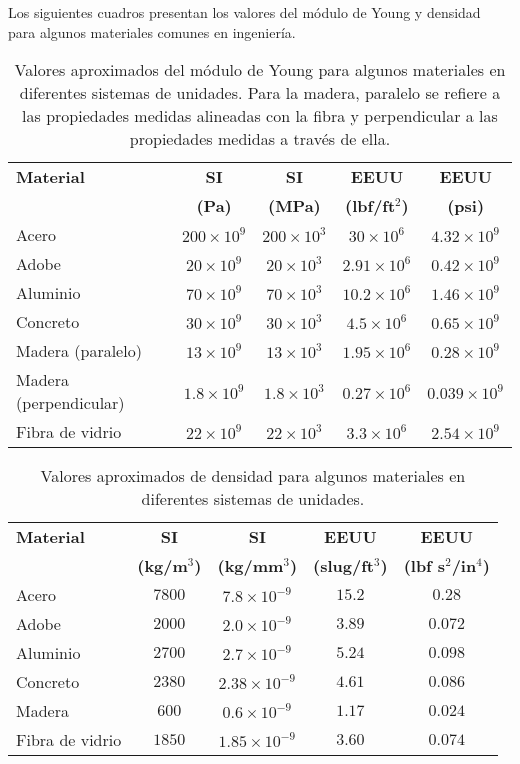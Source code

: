 Los siguientes cuadros presentan los valores del módulo de Young y densidad para algunos materiales comunes en ingeniería.
\begin{table}[h]
\centering
\begin{tabular}{lcccc}
\hline 
\textbf{Material} & \textbf{SI}  & \textbf{SI} & \textbf{EEUU} & \textbf{EEUU} \\
   & \textbf{(Pa)}  & \textbf{(MPa)} & \textbf{(lbf/ft$^2$)} & \textbf{(psi)} \\ 
\hline
Acero   &$200\times 10^9$ &$200\times 10^3$ &$30\times 10^6$ &$4.32\times 
10^9$\\
Adobe & $20 \times 10^9$ &$20 \times 10^3$ &$2.91 \times 10^6$ &$0.42 \times 
10^9$ \\
Aluminio &$70\times 10^9$ &$70 \times 10^3$ &$10.2 \times 10^6$ &$1.46 \times 10^9$\\
Concreto & $30\times 10^9$ &$30\times 10^3$ &$4.5\times 10^6$ &$0.65\times 
10^9$\\
Madera (paralelo) & $13\times 10^9$ &$13\times 10^3$ &$1.95\times 10^6$ 
&$0.28\times 10^9$\\
Madera (perpendicular) & $1.8\times 10^9$ &$1.8\times 10^3$ &$0.27\times 10^6$ 
&$0.039\times 10^9$\\
Fibra de vidrio & $22\times 10^9$ &$22\times 10^3$ &$3.3\times 10^6$ 
&$2.54\times 10^9$\\
\hline 
\end{tabular}
\caption{Valores aproximados del módulo de Young para algunos materiales en 
diferentes sistemas de unidades. Para la madera, paralelo se refiere a las 
propiedades medidas alineadas con la fibra y perpendicular a las propiedades
medidas a través de ella.}
\end{table}
\begin{table}[h]
\centering
\begin{tabular}{lcccc}
\hline 
\textbf{Material} & \textbf{SI}  & \textbf{SI} & \textbf{EEUU} & \textbf{EEUU} \\
 & \textbf{(kg/m$^3$)}  & \textbf{(kg/mm$^3$)} & \textbf{(slug/ft$^3$)} & \textbf{(lbf s$^2$/in$^4$)} \\ 
\hline
Acero   &$7800$ &$7.8 \times 10^{-9}$ &$15.2$ &$0.28$\\
Adobe   &$2000$ &$2.0 \times 10^{-9}$ &$3.89$ &$0.072$\\
Aluminio &$2700$ &$2.7 \times 10^{-9}$ &$5.24$ &$0.098$\\
Concreto & $2380$ &$2.38 \times 10^{-9}$ &$4.61$ &$0.086$\\
Madera   &$600$ &$0.6 \times 10^{-9}$ &$1.17$ &$0.024$\\ 
Fibra de vidrio  &$1850$ &$1.85 \times 10^{-9}$ &$3.60$ &$0.074$\\
\hline 
\end{tabular}
\caption{Valores aproximados de densidad para algunos materiales en diferentes 
sistemas de unidades.}
\end{table}


